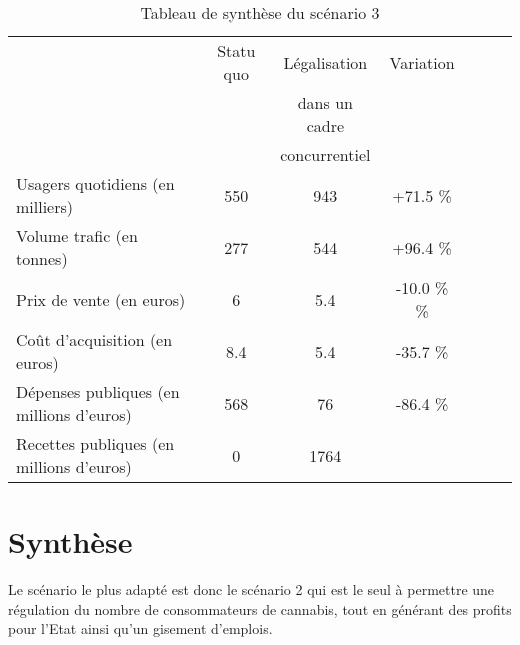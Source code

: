 \begin{table}[p]\centering
 \begin{tabular}{p{3.8cm}|cccccc}
  &Statu quo& Légalisation		& Variation  \\
  &   		& dans un cadre		&						\\
  &  		& concurrentiel	&			 			\\\hline \hline   
  Usagers quotidiens (en milliers)  & 550  	&943  	&+71.5 \%  	 \\\hline
  Volume trafic  (en tonnes)  		& 277  	&544  	&+96.4 \%  	 \\\hline
  Prix de vente (en euros)  		& 6  	&5.4&-10.0 \%  \%\\\hline
  Coût d’acquisition (en euros) 	& 8.4	&5.4 		&-35.7 \%  \\\hline
  Dépenses publiques (en millions d’euros) 	& 568  	&76       &-86.4 \%  \\ \hline
  Recettes publiques (en millions d’euros)	&0		& 1764	&\\\hline
 \end{tabular}
 \label{tab:synthese3}
 \caption{Tableau de synthèse du scénario 3 \cite{terraNova_rapport}}
\end{table} 
 
 
\section{Synthèse}

	Le scénario le plus adapté est donc le scénario 2 qui est le seul à permettre une régulation du nombre de consommateurs de cannabis, tout en générant des profits pour l'Etat ainsi qu'un gisement d'emplois.
